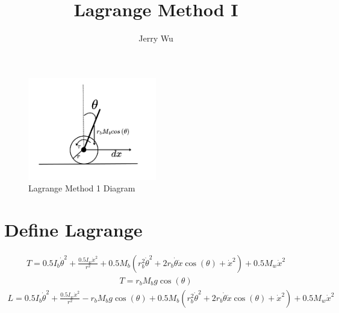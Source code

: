 \documentclass[12pt]{article}
\begin{document}
\title{\Huge Lagrange Method I}
\author{Jerry Wu}
\date{}
\maketitle

\begin{figure}[h]
    \centering
    \includegraphics[width=0.5\textwidth]{Lagrange_Diagram.png}
    \caption{Lagrange Method 1 Diagram}
    \label{fig:your-label}
\end{figure}

\section*{Define Lagrange}
\begin{multline*}
T= 0.5 I_{b} \dot{\theta}^{2} + \frac{0.5 I_{w} \dot{x}^{2}}{r^{2}} + 0.5 M_{b} \left(r_{b}^{2} \dot{\theta}^{2} + 2 r_{b} \dot{\theta} \dot{x} \cos{\left(\theta \right)} + \dot{x}^{2}\right) + 0.5 M_{w} \dot{x}^{2}
\end{multline*}
\begin{multline*}
T= r_{b} M_{b} g \cos{\left(\theta \right)}
\end{multline*}
\begin{multline*}
L= 0.5 I_{b} \dot{\theta}^{2} + \frac{0.5 I_{w} \dot{x}^{2}}{r^{2}} - r_{b} M_{b} g \cos{\left(\theta \right)} + 0.5 M_{b} \left(r_{b}^{2} \dot{\theta}^{2} + 2 r_{b} \dot{\theta} \dot{x} \cos{\left(\theta \right)} + \dot{x}^{2}\right) + 0.5 M_{w} \dot{x}^{2}
\end{multline*}
\end{document}
